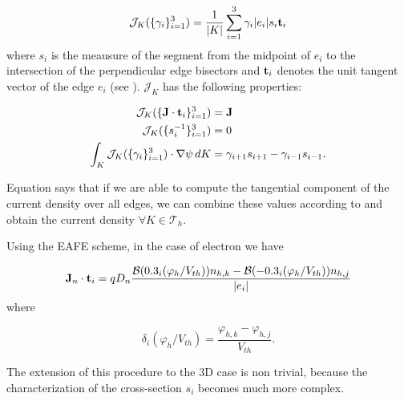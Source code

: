 \begin{equation}
\label{eq: map current}
\mathcal{J}_{K}(\{\gamma_i\}_{i=1}^3) = \dfrac{1}{|K|}\sum_{i=1}^3 \gamma_i |e_i| s_i \mathbf{t}_i
\end{equation}
where $s_i$ is the meausure of the segment from the midpoint  of $e_i$ to the intersection of the perpendicular edge bisectors and $\mathbf{t}_i$ denotes the unit tangent vector of the edge $e_i$ (see ).
$\mathcal{J}_K$ has the following properties:

\begin{align}
\mathcal{J}_K(\{\mathbf{J}\cdot \mathbf{t}_i\}_{i=1}^3) & = \mathbf{J} \label{eq: map is current} \\
 \mathcal{J}_K(\{s_i^{-1}\}_{i=1}^3) & = 0 \\
 \int_K \mathcal{J}_K(\{\gamma_i\}_{i=1}^3) \cdot \nabla \psi \, dK & = \gamma_{i+1}s_{i+1} - \gamma_{i-1}s_{i-1}.
\end{align}
 
Equation  says that if we are able to compute the tangential component of the current density over all edges, we can combine these values according to  and obtain the current density $\forall K \in \mathcal{T}_h$.
 
Using the EAFE scheme, in the case of electron we have
 
\begin{equation}
\label{eq: EAFE edge formula}
\small
\mathbf{J}_n\cdot \mathbf{t}_i = qD_n  \dfrac{\mathcal{B}(0.3_i(\varphi_h / V_{th}))n_{h,k} -  \mathcal{B}(-0.3_i(\varphi_h / V_{th}))n_{h,j}}{|e_i|}
\end{equation}
where 

\begin{equation}
\delta_i(\varphi_h/V_{th}) = \dfrac{\varphi_{h,k}-\varphi_{h,j}}{V_{th}}.
\end{equation}

%
The extension of this procedure to the 3D case is non trivial, because the characterization of the cross-section $s_i$ becomes much more complex.

